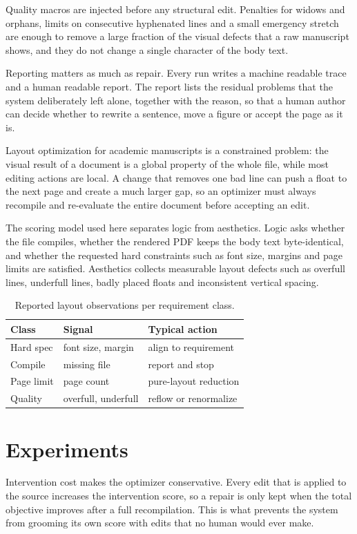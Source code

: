 \documentclass[10pt,a4paper]{article}
\begin{document}
Quality macros are injected before any structural edit. Penalties for widows and orphans, limits on consecutive hyphenated lines and a small emergency stretch are enough to remove a large fraction of the visual defects that a raw manuscript shows, and they do not change a single character of the body text.

Reporting matters as much as repair. Every run writes a machine readable trace and a human readable report. The report lists the residual problems that the system deliberately left alone, together with the reason, so that a human author can decide whether to rewrite a sentence, move a figure or accept the page as it is.

Layout optimization for academic manuscripts is a constrained problem: the visual result of a document is a global property of the whole file, while most editing actions are local. A change that removes one bad line can push a float to the next page and create a much larger gap, so an optimizer must always recompile and re-evaluate the entire document before accepting an edit.

The scoring model used here separates logic from aesthetics. Logic asks whether the file compiles, whether the rendered PDF keeps the body text byte-identical, and whether the requested hard constraints such as font size, margins and page limits are satisfied. Aesthetics collects measurable layout defects such as overfull lines, underfull lines, badly placed floats and inconsistent vertical spacing.


\begin{table}[tbp]\centering
\caption{Reported layout observations per requirement class.}
\begin{tabular}{lll}\toprule
Class & Signal & Typical action \\\midrule
Hard spec & font size, margin & align to requirement \\
Compile & missing file & report and stop \\
Page limit & page count & pure-layout reduction \\
Quality & overfull, underfull & reflow or renormalize \\\bottomrule
\end{tabular}
\end{table}

\section{Experiments}
Intervention cost makes the optimizer conservative. Every edit that is applied to the source increases the intervention score, so a repair is only kept when the total objective improves after a full recompilation. This is what prevents the system from grooming its own score with edits that no human would ever make.
\end{document}

